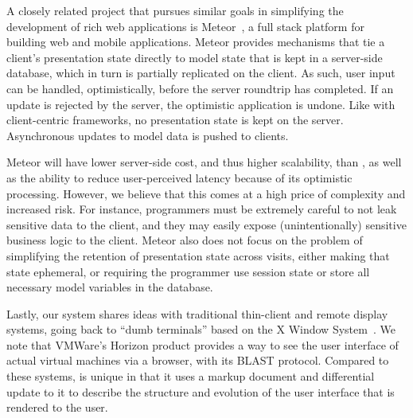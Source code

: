 

A closely related project that pursues similar goals in simplifying the development
of rich web applications is Meteor~\cite{meteor}, a full stack platform for building 
web and mobile applications.  Meteor provides mechanisms that tie a client's presentation
state directly to model state that is kept in a server-side database, which in turn is 
partially replicated on the client.  As such, user input can be handled, optimistically, before 
the server roundtrip has completed. If an update is rejected by the server, the optimistic 
application is undone. Like with client-centric frameworks, no presentation state is kept on
the server. Asynchronous updates to model data is pushed to clients.

Meteor will have lower server-side cost, and thus higher scalability, than \cb, as well
as the ability to reduce user-perceived latency because of its optimistic processing.
However, we believe that this comes at a high price of complexity and increased risk.
For instance, programmers must be extremely careful to not leak sensitive data to the 
client, and they may easily expose (unintentionally) sensitive business logic to the client.  
Meteor also does not focus on the problem of simplifying the retention of presentation
state across visits, either making that state ephemeral, or requiring the programmer
use session state or store all necessary model variables in the database.

Lastly, our system shares ideas with traditional thin-client and remote display 
systems, going back to ``dumb terminals'' based on the X Window 
System~\cite{ScheiflerGettys:acmtg1986}.  We note that VMWare's Horizon product provides
a way to see the user interface of actual virtual machines via a browser, with its
BLAST protocol.  Compared to these systems, \cb{} is 
unique in that it uses a markup document and differential update to it to 
describe the structure and evolution of the user interface that is rendered 
to the user.  

